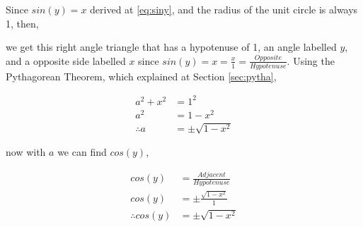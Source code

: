 \documentclass[12pt, titlepage]{article}
\begin{document}
    Since $sin(y)=x$ derived at \eqref{eq:siny}, and the radius of the unit circle is always 1, then,
    \begin{center}
    \end{center}
    we get this right angle triangle that has a hypotenuse of 1, an angle labelled $y$, and a opposite side labelled $x$ since $sin(y)=x=\frac{x}{1}=\frac{Opposite}{Hypotenuse}$. Using the Pythagorean Theorem, which explained at Section \ref{sec:pytha},
    \begin{center}
        \begin{align}
            a^2+x^2&=1^2\\
            a^2&=1-x^2\\
            \therefore a&=\pm \sqrt{1-x^2}
        \end{align}
    \end{center}
    \begin{center}
    \end{center}now with $a$ we can find $cos(y)$,
    \begin{center}
        \begin{align}
            cos(y)&=\frac{Adjacent}{Hypotenuse}\\
            cos(y)&=\pm \frac{\sqrt{1-x^2}}{1}\\
            \therefore cos(y)&=\pm \sqrt{1-x^2}
        \end{align}
    \end{center}
\end{document}
